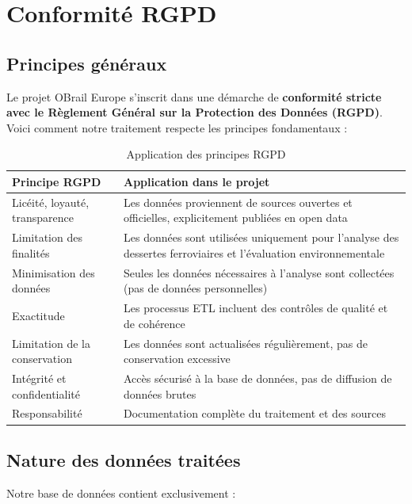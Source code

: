 \documentclass[12pt,a4paper]{article}
\begin{document}
\section{Conformité RGPD}

\subsection{Principes généraux}

Le projet OBrail Europe s'inscrit dans une démarche de \textbf{conformité stricte avec le Règlement Général sur la Protection des Données (RGPD)}. Voici comment notre traitement respecte les principes fondamentaux :

\begin{table}[h!]
\centering
\begin{tabular}{|p{4cm}|p{10.5cm}|}
\hline
\textbf{Principe RGPD} & \textbf{Application dans le projet} \\
\hline
Licéité, loyauté, transparence & Les données proviennent de sources ouvertes et officielles, explicitement publiées en open data \\
\hline
Limitation des finalités & Les données sont utilisées uniquement pour l'analyse des dessertes ferroviaires et l'évaluation environnementale \\
\hline
Minimisation des données & Seules les données nécessaires à l'analyse sont collectées (pas de données personnelles) \\
\hline
Exactitude & Les processus ETL incluent des contrôles de qualité et de cohérence \\
\hline
Limitation de la conservation & Les données sont actualisées régulièrement, pas de conservation excessive \\
\hline
Intégrité et confidentialité & Accès sécurisé à la base de données, pas de diffusion de données brutes \\
\hline
Responsabilité & Documentation complète du traitement et des sources \\
\hline
\end{tabular}
\caption{Application des principes RGPD}
\end{table}

\subsection{Nature des données traitées}

Notre base de données contient exclusivement :
\end{document}
